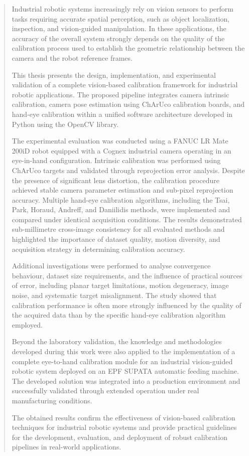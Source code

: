 \begin{abstract}
	
	Industrial robotic systems increasingly rely on vision sensors to perform
	tasks requiring accurate spatial perception, such as object localization,
	inspection, and vision-guided manipulation. In these applications, the
	accuracy of the overall system strongly depends on the quality of the
	calibration process used to establish the geometric relationship between the
	camera and the robot reference frames.
	
	This thesis presents the design, implementation, and experimental validation
	of a complete vision-based calibration framework for industrial robotic
	applications. The proposed pipeline integrates camera intrinsic calibration,
	camera pose estimation using ChArUco calibration boards, and hand-eye
	calibration within a unified software architecture developed in Python using
	the OpenCV library.
	
	The experimental evaluation was conducted using a FANUC LR Mate 200iD robot
	equipped with a Cognex industrial camera operating in an eye-in-hand
	configuration. Intrinsic calibration was performed using ChArUco targets and
	validated through reprojection error analysis. Despite the presence of
	significant lens distortion, the calibration procedure achieved stable camera
	parameter estimation and sub-pixel reprojection accuracy. Multiple hand-eye
	calibration algorithms, including the Tsai, Park, Horaud, Andreff, and
	Daniilidis methods, were implemented and compared under identical acquisition
	conditions. The results demonstrated sub-millimetre cross-image consistency
	for all evaluated methods and highlighted the importance of dataset quality,
	motion diversity, and acquisition strategy in determining calibration
	accuracy.
	
	Additional investigations were performed to analyse convergence behaviour,
	dataset size requirements, and the influence of practical sources of error,
	including planar target limitations, motion degeneracy, image noise, and
	systematic target misalignment. The study showed that calibration performance
	is often more strongly influenced by the quality of the acquired data than by
	the specific hand-eye calibration algorithm employed.
	
	Beyond the laboratory validation, the knowledge and methodologies developed
	during this work were also applied to the implementation of a complete
	eye-to-hand calibration module for an industrial vision-guided robotic system
	deployed on an EPF SUPATA automatic feeding machine. The developed solution
	was integrated into a production environment and successfully validated
	through extended operation under real manufacturing conditions.
	
	The obtained results confirm the effectiveness of vision-based calibration
	techniques for industrial robotic systems and provide practical guidelines
	for the development, evaluation, and deployment of robust calibration
	pipelines in real-world applications.
	
\end{abstract}
